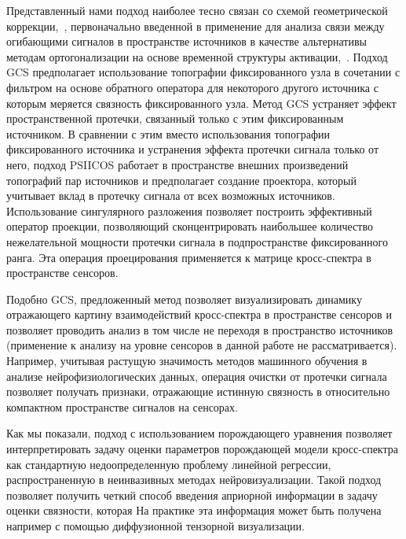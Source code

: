Представленный нами подход наиболее тесно связан со схемой геометрической
коррекции,~\cite{Wens2015}, первоначально введенной в применение для анализа
связи между огибающими сигналов в пространстве источников в качестве
альтернативы методам ортогонализации на основе временной структуры
активации,~\cite{Hipp2012, Colclough2015}. Подход GCS предполагает
использование топографии фиксированного узла в сочетании с фильтром на основе
обратного оператора для некоторого другого источника с которым меряется
связность фиксированного узла. Метод GCS устраняет эффект пространственной
протечки, связанный только с этим фиксированным источником.  В сравнении с этим
вместо использования топографии фиксированного источника и устранения эффекта
протечки сигнала только от него, подход PSIICOS работает в пространстве внешних
произведений топографий пар источников и предполагает создание проектора,
который учитывает вклад в протечку сигнала от всех возможных источников.
Использование сингулярного разложения позволяет построить эффективный оператор
проекции, позволяющий сконцентрировать наибольшее количество нежелательной
мощности протечки сигнала в подпространстве фиксированного ранга. Эта операция
проецирования применяется к матрице кросс-спектра в пространстве сенсоров.

Подобно GCS, предложенный метод позволяет визуализировать динамику отражающего
картину взаимодействий кросс-спектра в пространстве сенсоров и позволяет
проводить анализ в том числе не переходя в пространство источников (применение
к анализу на уровне сенсоров в данной работе не рассматривается). Например,
учитывая растущую значимость методов машинного обучения в анализе
нейрофизиологических данных, операция очистки от протечки сигнала позволяет
получать признаки, отражающие истинную связность в относительно компактном
пространстве сигналов на сенсорах.

Как мы показали, подход с использованием порождающего уравнения позволяет
интерпретировать задачу оценки параметров порождающей модели кросс-спектра как
стандартную недоопределенную проблему линейной регрессии, распространенную в
неинвазивных методах нейровизуализации. Такой подход позволяет получить четкий
способ введения априорной информации в задачу оценки связности, которая На
практике эта информация может быть получена например с помощью диффузионной
тензорной визуализации.

